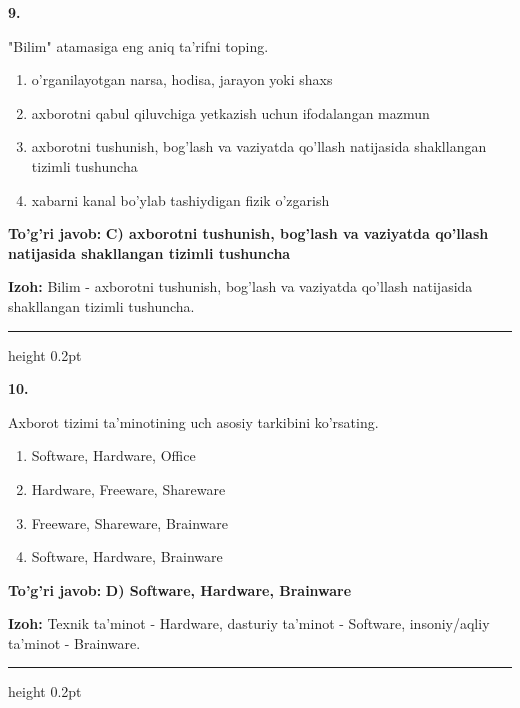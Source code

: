 \documentclass[10pt,a4paper,oneside]{article}
\begin{document}
\noindent\textbf{\color{ink}9.}
\par
"Bilim" atamasiga eng aniq ta'rifni toping.
\begin{enumerate}[label=\Alph*),leftmargin=9mm]
\item o'rganilayotgan narsa, hodisa, jarayon yoki shaxs
\item axborotni qabul qiluvchiga yetkazish uchun ifodalangan mazmun
\item axborotni tushunish, bog'lash va vaziyatda qo'llash natijasida shakllangan tizimli tushuncha
\item xabarni kanal bo'ylab tashiydigan fizik o'zgarish
\end{enumerate}
\begin{tcolorbox}[enhanced,breakable,colback=teal!4,colframe=teal!50!black,boxrule=0.5pt,arc=1.1mm,left=3mm,right=3mm,top=1.7mm,bottom=1.7mm,before skip=2mm,after skip=2mm]
\textbf{\color{teal}To'g'ri javob:} \textbf{C) axborotni tushunish, bog'lash va vaziyatda qo'llash natijasida shakllangan tizimli tushuncha}
\par\smallskip
\textbf{Izoh:} Bilim - axborotni tushunish, bog'lash va vaziyatda qo'llash natijasida shakllangan tizimli tushuncha.
\end{tcolorbox}
\vspace{2mm}\hrule height 0.2pt \vspace{3mm}

\noindent\textbf{\color{ink}10.}
\par
Axborot tizimi ta'minotining uch asosiy tarkibini ko'rsating.
\begin{enumerate}[label=\Alph*),leftmargin=9mm]
\item Software, Hardware, Office
\item Hardware, Freeware, Shareware
\item Freeware, Shareware, Brainware
\item Software, Hardware, Brainware
\end{enumerate}
\begin{tcolorbox}[enhanced,breakable,colback=teal!4,colframe=teal!50!black,boxrule=0.5pt,arc=1.1mm,left=3mm,right=3mm,top=1.7mm,bottom=1.7mm,before skip=2mm,after skip=2mm]
\textbf{\color{teal}To'g'ri javob:} \textbf{D) Software, Hardware, Brainware}
\par\smallskip
\textbf{Izoh:} Texnik ta'minot - Hardware, dasturiy ta'minot - Software, insoniy/aqliy ta'minot - Brainware.
\end{tcolorbox}
\vspace{2mm}\hrule height 0.2pt \vspace{3mm}
\end{document}
